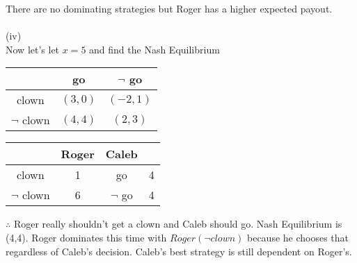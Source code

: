 \documentclass[12pt,letter]{article}
\begin{document}
There are no dominating strategies but Roger has a higher expected payout.
\\
\\
(iv)\\
Now let's let $x=5$ and find the Nash Equilibrium
\begin{figure*}[h!]
\centering
\begin{tabular}{|c|c|c|}
	\hline
	& go & $\neg$ go\\
	\hline
	clown & $(3,0)$ & $(-2,1)$\\
	\hline
	$\neg$ clown & $(4,4)$ & $(2,3)$\\
	\hline
\end{tabular}
\end{figure*}
\begin{figure*}[h!]
\centering
\begin{tabular}{c c|c c}
	& Roger & Caleb\\
	\hline
	clown & 1 & go & 4\\
	$\neg$ clown & 6 & $\neg$ go & 4
\end{tabular}
\end{figure*}
\FloatBarrier
$\therefore$ Roger really shouldn't get a clown and Caleb should go. Nash
Equilibrium is (4,4). Roger 
dominates this time with $Roger(\neg clown)$ because he chooses that regardless
of Caleb's decision. Caleb's best strategy is still dependent on Roger's. 
\end{document}
